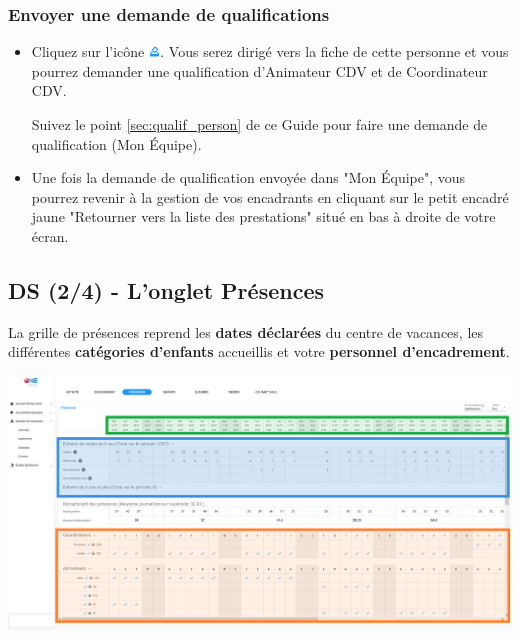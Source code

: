 \subsubsection{Envoyer une demande de qualifications}
\begin{itemize}
    \item Cliquez sur l'icône \includegraphics[width=0.3cm]{Images/icon/button_dmd_qualif.png}. Vous serez dirigé vers la fiche de cette personne et vous pourrez demander une qualification d'Animateur CDV et de Coordinateur CDV.
        \begin{conseil}
        Suivez le point \ref{sec:qualif_person} de ce Guide pour faire une demande de qualification (Mon Équipe). 
        \end{conseil}
    \item Une fois la demande de qualification envoyée dans "Mon Équipe", vous pourrez revenir à la gestion de vos encadrants en cliquant sur le petit encadré jaune "Retourner vers la liste des prestations" situé en bas à droite de votre écran. 
\end{itemize}

 
\subsection{DS (2/4) - L'onglet Présences}\label{cdv_présence}
La grille de présences reprend les \textbf{\textcolor{vert}{dates déclarées}} du centre de vacances, les différentes \textbf{\textcolor{bleu}{catégories d'enfants}} accueillis et votre \textbf{\textcolor{ocre}{personnel d'encadrement}}.




\vspace*{4mm}
\centerline{\includegraphics[width=18cm]{Images/cdv/cdv-ds-presences.png}}

